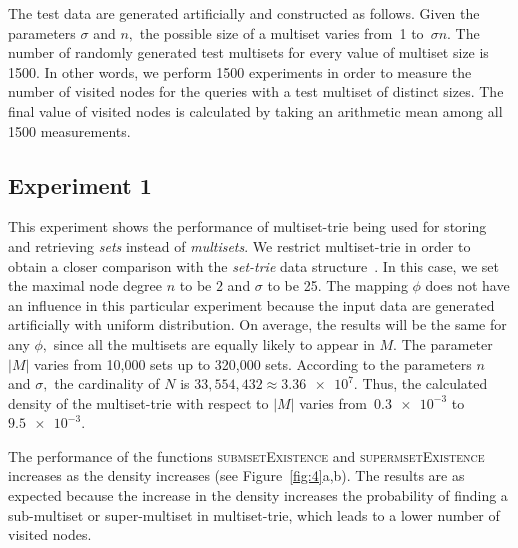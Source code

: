 \documentclass[algorithms,article,accept,pdftex,moreauthors]{Definitions/mdpi}
\begin{document}
The test data are generated artificially and constructed as follows. Given the 
parameters $\sigma$ and $n,$ the possible size of a multiset varies from~1 
to~$\sigma n.$ The number of randomly generated test multisets for every 
value of multiset size is 1500. In other words, we perform 1500 experiments 
in order to measure the number of visited nodes for the queries with a test multiset 
of distinct sizes. The final value of visited nodes is calculated by taking an 
arithmetic mean among all 1500 measurements.


\subsection{Experiment 1} \label{s:exp1}
This experiment shows the performance of multiset-trie being used for storing 
and retrieving \emph{sets} instead of \emph{multisets}. We restrict multiset-trie in order 
to obtain a closer comparison with the \emph{set-trie} data structure~\cite{savnik2013index}.
In this case, we set the maximal node degree $n$ to be $2$ and $\sigma$ to be 25. 
The mapping $\phi$ does not have an influence in this particular experiment
because the input data are generated artificially with uniform distribution. On 
average, the results will be the same for any $\phi,$ since all the multisets are 
equally likely to appear in $M.$ The parameter $|M|$ varies from 10,000 %
 sets up 
to 320,000 sets. According to the parameters $n$ and $\sigma,$ the cardinality of 
$N$ is $33,554,432\approx \num{3.36e+7}.$ Thus, the calculated density of the 
multiset-trie with respect to $|M|$ varies from~$\num{0.3e-3}$ to~$\num{9.5e-3}.$


The performance of the functions \textsc{submsetExistence} and 
\textsc{supermsetExistence} increases as the density increases (see Figure~\ref{fig:4}a,b). The results are as expected because the increase in the 
density increases the probability of finding a sub-multiset or super-multiset in 
multiset-trie, which leads to a lower number of visited nodes. 
\end{document}
